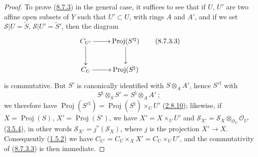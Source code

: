 \begin{proof}
To prove (\hyperref[II.8.7.3]{8.7.3}) in the general case, it suffices
to see that if $U$, $U'$ are two affine open subsets of $Y$ such that
$U'\subset U$, with rings $A$ and $A'$, and if we set
$\mathcal{S}|U=\widetilde{S}$, $\mathcal{S}|U'=\widetilde{S}'$, then the
diagram
\begin{equation}
\label{II.8.7.3.3}
  \xymatrix{
    C_{U'}\ar[r]\ar[d] & \operatorname{Proj}(S'^{\natural})\ar[d]\\
    C_U\ar[r] & \operatorname{Proj}(S^{\natural})
  }
\tag{8.7.3.3}
\end{equation}
is commutative. But $S'$ is canonically identified with $S\otimes_A A'$, hence
$S'^{\natural}$ with
\[
  S^{\natural}\otimes_S S'=S^{\natural}\otimes_A A'~;
\]
we therefore have
$\operatorname{Proj}(S'^{\natural})=\operatorname{Proj}(S^{\natural})
\times_U U'$ (\hyperref[II.2.8.10]{2.8.10}); likewise, if
$X=\operatorname{Proj}(S)$, $X'=\operatorname{Proj}(S')$, we have
$X'=X\times_U U'$ and
$\mathcal{S}_{X'}=\mathcal{S}_X\otimes_{\mathcal{O}_U}\mathcal{O}_{U'}$
(\hyperref[II.3.5.4]{3.5.4}), in other words
$\mathcal{S}_{X'}=j^*(\mathcal{S}_X)$, where $j$ is the projection $X'\to X$.
Consequently (\hyperref[II.1.5.2]{1.5.2}) we have
$C_{U'}=C_U\times_X X'=C_U\times_U U'$, and the commutativity of
(\hyperref[II.8.7.3.3]{8.7.3.3}) is then immediate.
\end{proof}

